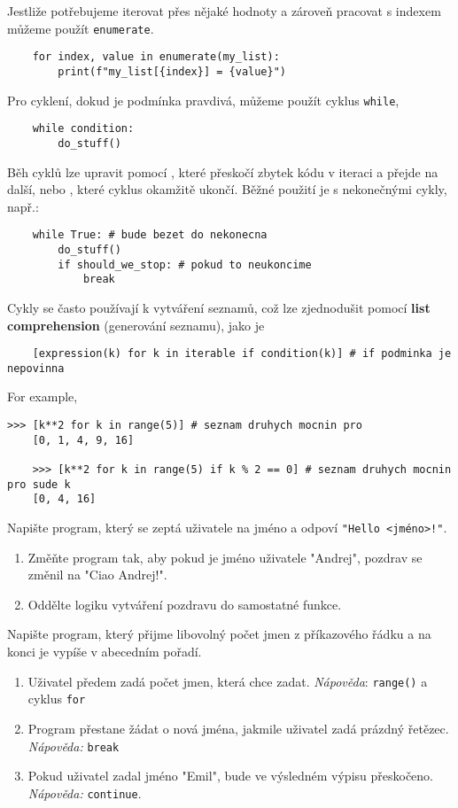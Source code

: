Jestliže potřebujeme iterovat přes nějaké hodnoty a zároveň pracovat s indexem můžeme použít \lstinline{enumerate}.
\begin{lstlisting}
    for index, value in enumerate(my_list):
        print(f"my_list[{index}] = {value}")
\end{lstlisting}

Pro cyklení, dokud je podmínka pravdivá, můžeme použít cyklus \verb|while|,
\begin{lstlisting}
    while condition:
        do_stuff()
\end{lstlisting}

Běh cyklů lze upravit pomocí , které přeskočí zbytek kódu v iteraci a přejde na další, nebo , které cyklus okamžitě ukončí. Běžné použití je s nekonečnými cykly, např.:
\begin{lstlisting}
    while True: # bude bezet do nekonecna
        do_stuff()
        if should_we_stop: # pokud to neukoncime
            break
\end{lstlisting}

Cykly se často používají k vytváření seznamů, což lze zjednodušit pomocí \textbf{list comprehension} (generování seznamu), jako je
\begin{lstlisting}
    [expression(k) for k in iterable if condition(k)] # if podminka je nepovinna
\end{lstlisting}
For example,
\begin{lstlisting}[caption=List comprehension.]
    >>> [k**2 for k in range(5)] # seznam druhych mocnin pro
    [0, 1, 4, 9, 16]

    >>> [k**2 for k in range(5) if k % 2 == 0] # seznam druhych mocnin pro sude k
    [0, 4, 16]
\end{lstlisting}

\begin{exercise}
    Napište program, který se zeptá uživatele na jméno a odpoví \verb|"Hello <jméno>!"|.
    \begin{enumerate}
        \item Změňte program tak, aby pokud je jméno uživatele "Andrej", pozdrav se změnil na "Ciao Andrej!".
        \item Oddělte logiku vytváření pozdravu do samostatné funkce.
    \end{enumerate}
\end{exercise}
\begin{exercise}
    Napište program, který přijme libovolný počet jmen z příkazového řádku a na konci je vypíše v abecedním pořadí.
    \begin{enumerate}
        \item Uživatel předem zadá počet jmen, která chce zadat. \emph{Nápověda}: \verb|range()| a cyklus \verb|for|
        \item Program přestane žádat o nová jména, jakmile uživatel zadá prázdný řetězec. \emph{Nápověda:} \verb|break|
        \item Pokud uživatel zadal jméno "Emil", bude ve výsledném výpisu přeskočeno. \emph{Nápověda:} \verb|continue|.
    \end{enumerate}
\end{exercise}


